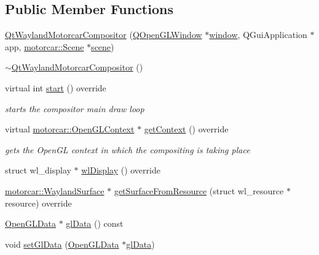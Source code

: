 \subsection*{Public Member Functions}
\begin{DoxyCompactItemize}
\item 
\hyperlink{classqtmotorcar_1_1QtWaylandMotorcarCompositor_a0de2ac0cbe6d725a501375a84573c470}{Qt\-Wayland\-Motorcar\-Compositor} (\hyperlink{classQOpenGLWindow}{Q\-Open\-G\-L\-Window} $\ast$\hyperlink{structwindow}{window}, Q\-Gui\-Application $\ast$app, \hyperlink{classmotorcar_1_1Scene}{motorcar\-::\-Scene} $\ast$\hyperlink{classqtmotorcar_1_1QtWaylandMotorcarCompositor_a8bb6c8e6a7acad99b814b192534f3ee2}{scene})
\item 
\hyperlink{classqtmotorcar_1_1QtWaylandMotorcarCompositor_a8d0178c57bdbe03ef7e4db6e13900950}{$\sim$\-Qt\-Wayland\-Motorcar\-Compositor} ()
\item 
virtual int \hyperlink{classqtmotorcar_1_1QtWaylandMotorcarCompositor_a34cd3f4acc535584eb066d3fe32ed9bf}{start} () override
\begin{DoxyCompactList}\small\item\em starts the compositor main draw loop \end{DoxyCompactList}\item 
virtual \hyperlink{classmotorcar_1_1OpenGLContext}{motorcar\-::\-Open\-G\-L\-Context} $\ast$ \hyperlink{classqtmotorcar_1_1QtWaylandMotorcarCompositor_a1fb6e9d59011be2912bc9cf51496b191}{get\-Context} () override
\begin{DoxyCompactList}\small\item\em gets the Open\-G\-L context in which the compositing is taking place \end{DoxyCompactList}\item 
struct wl\-\_\-display $\ast$ \hyperlink{classqtmotorcar_1_1QtWaylandMotorcarCompositor_a9e29a67d95d6aa74a08b2a3deed19dfe}{wl\-Display} () override
\item 
\hyperlink{classmotorcar_1_1WaylandSurface}{motorcar\-::\-Wayland\-Surface} $\ast$ \hyperlink{classqtmotorcar_1_1QtWaylandMotorcarCompositor_ad4262e2dce170d25080e5c205fecc5ca}{get\-Surface\-From\-Resource} (struct wl\-\_\-resource $\ast$resource) override
\item 
\hyperlink{classOpenGLData}{Open\-G\-L\-Data} $\ast$ \hyperlink{classqtmotorcar_1_1QtWaylandMotorcarCompositor_a50bc0b510d20d0298b9e164804543f81}{gl\-Data} () const 
\item 
void \hyperlink{classqtmotorcar_1_1QtWaylandMotorcarCompositor_a0122a32ec769e7190b3a2e0a838f0053}{set\-Gl\-Data} (\hyperlink{classOpenGLData}{Open\-G\-L\-Data} $\ast$\hyperlink{classqtmotorcar_1_1QtWaylandMotorcarCompositor_a50bc0b510d20d0298b9e164804543f81}{gl\-Data})

\end{DoxyCompactItemize}
